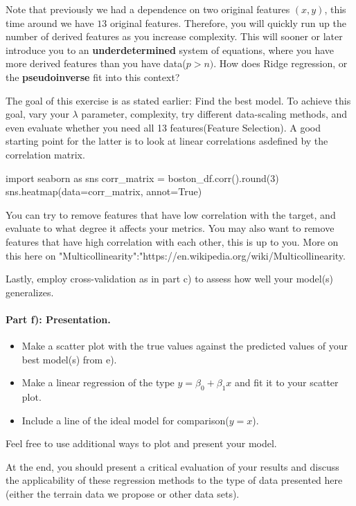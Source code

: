 \documentclass[%
oneside,                 %
final,                   %
10pt]{article}
\begin{document}
Note that previously we had a dependence on
two original features $(x,y)$, this time around we have $13$ original
features. Therefore, you will quickly run up the number of derived
features as you increase complexity. This will sooner or later
introduce you to an \textbf{underdetermined} system of equations, where you
have more derived features than you have data($p>n)$. How does Ridge
regression, or the \textbf{pseudoinverse} fit into this context?

The goal of this exercise is as stated earlier: Find the best model.
To achieve this goal, vary your $\lambda$ parameter, complexity, try
different data-scaling methods, and even evaluate whether you need all
13 features(Feature Selection). A good starting point for the latter
is to look at linear correlations asdefined by the correlation matrix.


\bpycod
import seaborn as sns
corr_matrix = boston_df.corr().round(3)
sns.heatmap(data=corr_matrix, annot=True)
\epycod

You can try to remove features that have low correlation with the
target, and evaluate to what degree it affects your metrics. You may
also want to remove features that have high correlation with each
other, this is up to you.  More on this here on
"Multicollinearity":"https://en.wikipedia.org/wiki/Multicollinearity.



Lastly, employ cross-validation as in part c) to assess how well your
model(s) generalizes.

\paragraph{Part f): Presentation.}
\begin{itemize}
\item Make a scatter plot with the true values against the predicted values of your best model(s) from e).

\item Make a linear regression of the type $y = \beta_0 + \beta_1 x$ and fit it to your scatter plot.

\item Include a line of the ideal model for comparison($y=x$).
\end{itemize}

\noindent
Feel free to use additional ways to plot and present your model.



At the end, you should present a critical evaluation of your results
and discuss the applicability of these regression methods to the type
of data presented here (either the terrain data we propose or other data sets).
\end{document}

